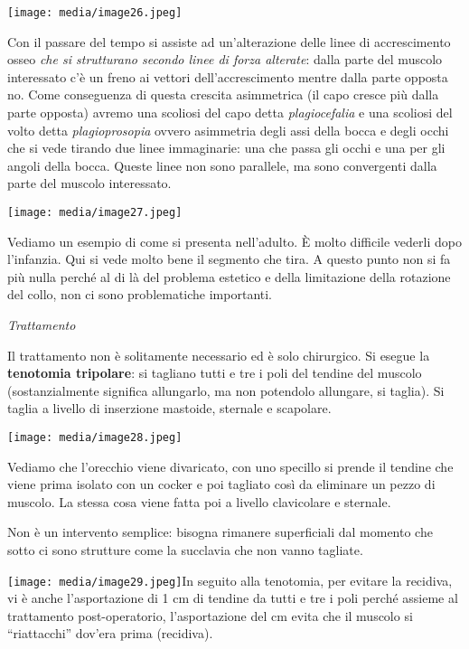 \documentclass[]{article}
\begin{document}
\texttt{[image: media/image26.jpeg]}

Con il passare del tempo si assiste ad un'alterazione delle linee di
accrescimento osseo \emph{che si strutturano secondo linee di forza
alterate}: dalla parte del muscolo interessato c'è un freno ai vettori
dell'accrescimento mentre dalla parte opposta no. Come conseguenza di
questa crescita asimmetrica (il capo cresce più dalla parte opposta)
avremo una scoliosi del capo detta \emph{plagiocefalia} e una scoliosi
del volto detta \emph{plagioprosopia} ovvero asimmetria degli assi della
bocca e degli occhi che si vede tirando due linee immaginarie: una che
passa gli occhi e una per gli angoli della bocca. Queste linee non sono
parallele, ma sono convergenti dalla parte del muscolo interessato.

\texttt{[image: media/image27.jpeg]}

Vediamo un esempio di come si presenta nell'adulto. È molto difficile
vederli dopo l'infanzia. Qui si vede molto bene il segmento che tira. A
questo punto non si fa più nulla perché al di là del problema estetico e
della limitazione della rotazione del collo, non ci sono problematiche
importanti.

\emph{Trattamento}

Il trattamento non è solitamente necessario ed è solo chirurgico. Si
esegue la \textbf{tenotomia tripolare}: si tagliano tutti e tre i poli
del tendine del muscolo (sostanzialmente significa allungarlo, ma non
potendolo allungare, si taglia). Si taglia a livello di inserzione
mastoide, sternale e scapolare.

\texttt{[image: media/image28.jpeg]}

Vediamo che l'orecchio viene divaricato, con uno specillo si prende il
tendine che viene prima isolato con un cocker e poi tagliato così da
eliminare un pezzo di muscolo. La stessa cosa viene fatta poi a livello
clavicolare e sternale.

Non è un intervento semplice: bisogna rimanere superficiali dal momento
che sotto ci sono strutture come la succlavia che non vanno tagliate.

\texttt{[image: media/image29.jpeg]}In
seguito alla tenotomia, per evitare la recidiva, vi è anche
l'asportazione di 1 cm di tendine da tutti e tre i poli perché assieme
al trattamento post-operatorio, l'asportazione del cm evita che il
muscolo si ``riattacchi'' dov'era prima (recidiva).
\end{document}
